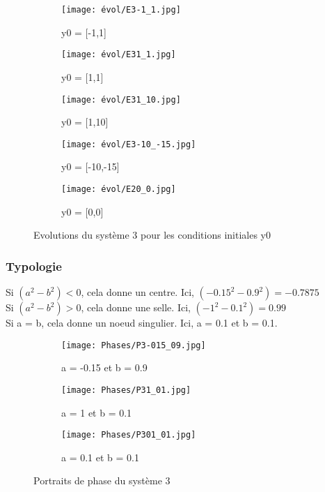 \documentclass[utf8]{article}
\begin{document}
\begin{figure}[!htb]
\centering
\begin{subfigure}{.3\textwidth}
  \centering
  \texttt{[image: évol/E3-1\_1.jpg]}
  \caption{y0 = [-1,1]}
  \label{fig:sub1}
\end{subfigure}%
\begin{subfigure}{.3\textwidth}
  \centering
  \texttt{[image: évol/E31\_1.jpg]}
  \caption{y0 = [1,1]}
  \label{fig:sub2}
  \end{subfigure}
  \begin{subfigure}{.3\textwidth}
  \centering
  \texttt{[image: évol/E31\_10.jpg]}
  \caption{y0 = [1,10]}
  \end{subfigure}%
  \begin{subfigure}{.3\textwidth}
  \centering
  \texttt{[image: évol/E3-10\_-15.jpg]}
  \caption{y0 = [-10,-15]}
  \end{subfigure}
  \begin{subfigure}{.3\textwidth}
  \centering
  \texttt{[image: évol/E20\_0.jpg]}
  \caption{y0 = [0,0]}
  \end{subfigure}
\caption{Evolutions du système 3 pour les conditions initiales y0}
\end{figure}

\subsubsection{Typologie}

Si $(a^2-b^2) < 0$, cela donne un centre. Ici, $(-0.15^2-0.9^2) = -0.7875$
\\
Si $(a^2-b^2) > 0$, cela donne une selle. Ici, $(-1^2-0.1^2) = 0.99$
\\
Si a = b, cela donne un noeud singulier. Ici, a = 0.1 et b = 0.1.
\\

\begin{figure}[!htb]
\centering
\begin{subfigure}{.4\textwidth}
  \centering
  \texttt{[image: Phases/P3-015\_09.jpg]}
  \caption{a = -0.15 et b = 0.9}
  \label{fig:sub1}
\end{subfigure}%
\begin{subfigure}{.4\textwidth}
  \centering
  \texttt{[image: Phases/P31\_01.jpg]}
  \caption{a = 1 et b = 0.1}
  \label{fig:sub2}
  \end{subfigure}
\begin{subfigure}{.4\textwidth}
  \centering
  \texttt{[image: Phases/P301\_01.jpg]}
  \caption{a = 0.1 et b = 0.1}
  \label{fig:sub2}
  \end{subfigure}
\caption{Portraits de phase du système 3}
\end{figure}
\end{document}
